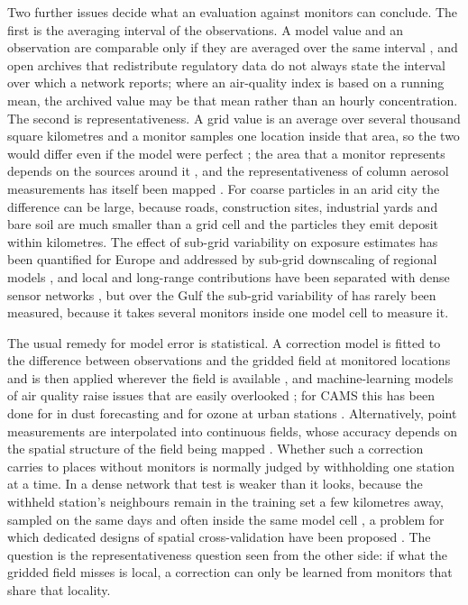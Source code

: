Two further issues decide what an evaluation against monitors can conclude. The first is the
averaging interval of the observations. A model value and an observation are comparable only if
they are averaged over the same interval \citep{schutgens2017}, and open archives that
redistribute regulatory data \citep{rosales2025} do not always state the interval over which a
network reports; where an air-quality index is based on a running mean, the archived value may be
that mean rather than an hourly concentration. The second is representativeness. A grid value is
an average over several thousand square kilometres and a monitor samples one location inside
that area, so the two would differ even if the model were perfect
\citep{schutgens2016,schutgens2017,janjic2018}; the area that a monitor represents depends on the
sources around it \citep{janssen2012,righini2014,duyzer2015}, and the representativeness of
column aerosol measurements has itself been mapped \citep{chen2025aod}. For coarse particles in
an arid city the difference can be large, because roads, construction sites, industrial yards
and bare soil are much smaller than a grid cell and the particles they emit deposit within
kilometres. The effect of sub-grid variability on exposure estimates has been quantified for
Europe \citep{denby2011,denby2024} and addressed by sub-grid downscaling of regional models
\citep{theobald2016}, and local and long-range contributions have been separated with dense
sensor networks \citep{defoy2024}, but over the Gulf the sub-grid variability of \pmten{} has
rarely been measured, because it takes several monitors inside one model cell to measure it.

The usual remedy for model error is statistical. A correction model is fitted to the difference
between observations and the gridded field at monitored locations and is then applied wherever
the field is available \citep{djalalova2015,huang2017}, and machine-learning models of air
quality raise issues that are easily overlooked \citep{tang2024ml}; for CAMS this has been done for
\pmten{} in dust forecasting \citep{sarafian2025} and for ozone at urban stations
\citep{kaffashzadeh2024}. Alternatively, point measurements are interpolated into continuous
fields, whose accuracy depends on the spatial structure of the field being mapped
\citep{kang2026mapping}. Whether such a correction
carries to places without monitors is normally judged by withholding one station at a time. In a
dense network that test is weaker than it looks, because the withheld station's neighbours remain
in the training set a few kilometres away, sampled on the same days and often inside the same
model cell \citep{roberts2017,ploton2020,meyer2021aoa,wadoux2021}, a problem for which
dedicated designs of spatial cross-validation have been proposed
\citep{valavi2019,mila2022,linnenbrink2024,meyer2022global}. The question is the
representativeness question seen from the other side: if what the gridded field misses is local,
a correction can only be learned from monitors that share that locality.

